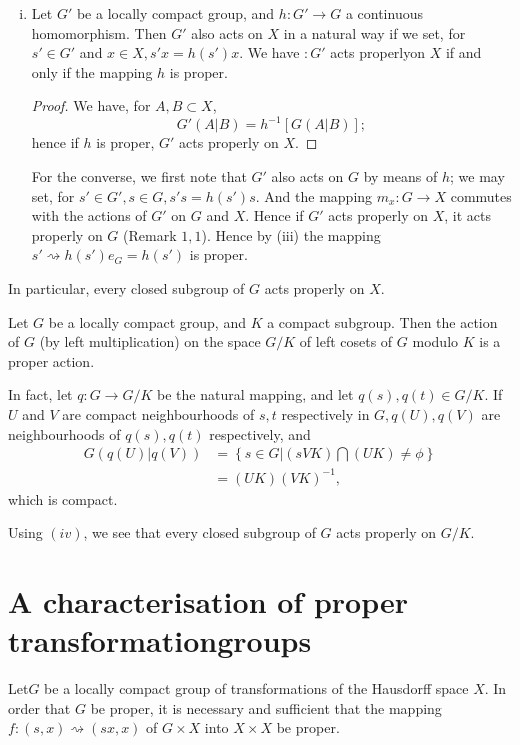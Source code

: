 \begin{enumerate}[(i)]
\item Let $G'$ be a locally compact group, and $h:G' \to G$ a
  continuous homomorphism. Then $G'$ also acts on $X$ in a natural way
  if we set, for $s' \in G'$ and $x \in X, s'x=h(s')x$. We have $:G'$
  acts properly\pageoriginale on $X$ if and only if the mapping $h$ is proper. 
\begin{proof}
  We have, for $A, B \subset X$,
  $$
  G'(A | B) = h^{-1}[G(A | B)];
  $$
  hence if $h$ is proper, $G'$ acts properly on $X$.
\end{proof}

For the converse, we first note that $G'$ also acts on $G$ by means of
$h$; we may set, for $s' \in G', s \in G, s's=h(s')s$. And the mapping
$m_x:G \to X$ commutes with the actions of $G'$ on $G$ and $X$. Hence
if $G'$ acts properly on $X$, it acts properly on $G$ (Remark $1,
1$). Hence by (iii) the mapping $s' \rightsquigarrow h(s')e_G=h(s')$
is proper. 
\end{enumerate}

In particular, every closed subgroup of $G$ acts properly on $X$.

\begin{example*}
  Let $G$ be a locally compact group, and $K$ a compact subgroup. Then
  the action of $G$ (by left multiplication) on the space $G/K$ of left
  cosets of $G$ modulo $K$ is a proper action. 
  
  In fact, let $q : G \to G/K$ be the natural mapping, and let $q(s), q
  (t) \in G/K$. If $U$ and $V$ are compact neighbourhoods of $s, t$
  respectively in $G, q(U), q(V)$ are neighbourhoods of $q(s), q(t)$
  respectively, and 
  \begin{align*}
    G (q(U) | q(V)) &=\left\{ s \in G | (sVK)\bigcap (UK) \neq \phi \right\}\\
    &=(UK)(VK)^{-1},
  \end{align*}
  which is compact.
\end{example*}

Using $(iv)$, we see that every closed subgroup of $G$ acts properly
on $G/K$. 

\section[A characterisation of proper transformation groups]{A characterisation of proper transformation\hfill\break groups}%

\begin{thm}%
  Let\pageoriginale $G$ be a locally compact group of  transformations of the
  Hausdorff space $X$. In order that $G$ be proper, it is necessary and
  sufficient that the mapping $f : (s, x)\rightsquigarrow (sx, x)$ of
  $G \times X$ into $X \times X$ be proper. 
\end{thm}

